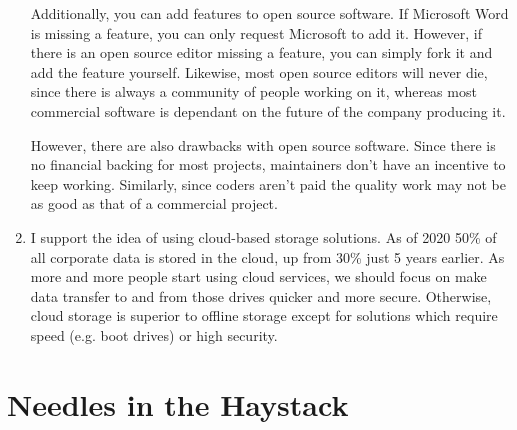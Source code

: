 \documentclass{scrartcl}
\begin{document}
\begin{enumerate}
Additionally, you can add features to open source software. If Microsoft Word is
missing a feature, you can only request Microsoft to add it. However, if
there is an open source editor missing a feature, you can simply fork it and
add the feature yourself. Likewise, most open source editors will never die,
since there is always a community of people working on it, whereas most
commercial software is dependant on the future of the company producing it.

However, there are also drawbacks with open source software. Since there is
no financial backing for most projects, maintainers don't have an incentive
to keep working. Similarly, since coders aren't paid the quality work may not
be as good as that of a commercial project.

\item I support the idea of using cloud-based storage solutions. As of 2020 50\% of all
corporate data is stored in the cloud, up from 30\% just 5 years earlier. As
more and more people start using cloud services,  we should focus on make
data transfer to and from those drives quicker and more secure. Otherwise,
cloud storage is superior to offline storage except for solutions which
require speed (e.g. boot drives) or high security.
\end{enumerate}

\section{Needles in the Haystack}
\label{sec:org141bb07}
\end{document}
